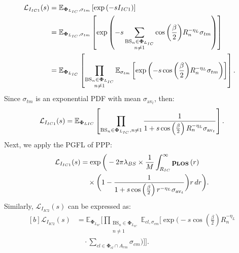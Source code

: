 \documentclass[journal]{IEEEtran}
\begin{document}
\small
\begin{equation}
\begin{aligned}[b]
\!\!\!\!\mathcal{L}_{I_{IC1}} (s)&=\mathbb{E}_{\bold\Phi_{L_{IC}},\sigma_{tm}}\left[\exp\left(-sI_{IC1}\right)\right]\\
\!\!\!\!&=\mathbb{E}_{\bold\Phi_{L_{IC}},\sigma_{tm}}\left[\exp\left(-s \sum\limits_{\substack{\text{BS}_{n }\in \bold\Phi_{L_{IC}}\\ n \neq 1}} \cos{\left(\frac{\beta}{2}\right)} R_n^{-\eta_L} \sigma_{tm} \right)\right]\\
\!\!\!\!&=\mathbb{E}_{\bold\Phi_{L_{IC}}}\left[\prod\limits_{\substack{\text{BS}_{n }\in \bold\Phi_{L_{IC}}\\ n \neq 1}}\mathbb{E}_{\sigma_{tm}}\left[\exp\left(- s  \cos{\left(\frac{\beta}{2}\right)} R_n^{-\eta_L} \sigma_{tm}\right)\right]\right].\\
\end{aligned}
\end{equation}
\normalsize
Since \( \sigma_{tm} \) is an exponential PDF with mean \( \sigma_{\text{av}_t} \), then:
\begin{equation}
\mathcal{L}_{I_{IC1}}(s) = \mathbb{E}_{\bold\Phi_{LIC}} \left[ \prod_{\text{BS}_n \in \bold\Phi_{L_{IC}}, n \neq 1} \frac{1}{1 + s \cos\left( \frac{\beta}{2} \right) R_n^{-\eta_L} \sigma_{\text{av}_t}} \right].
\end{equation}
Next, we apply the PGFL of PPP:
\begin{equation}
\begin{aligned}
\mathcal{L}_{I_{IC1}}(s) &= \exp\bigg( - 2 \pi \lambda_{BS} \times \frac{1}{M} \int_{R_{IC}}^{\infty} \bold p_{\bold{LOS}}\left(r\right)\\
&\quad \times \bigg( 1 - \frac{1}{1 + s \cos\left( \frac{\beta}{2} \right) r^{-\eta_L} \sigma_{\text{av}_t}} \bigg) r \, dr \bigg).
\end{aligned}
\end{equation}
Similarly, $\mathcal{L}_{I_{IC2}} (s)$ can be expressed as:
\small
\begin{equation}
\begin{aligned}[b]\label{int_clu_inmd}
\mathcal{L}_{I_{IC2}} (s) 
&= \mathbb{E}_{\boldsymbol{\Phi}_{L_{IC}}} 
\Bigg[ \prod\limits_{\substack{\text{BS}_{n} \in \boldsymbol{\Phi}_{L_{IC}} \\ n \neq 1}} 
\mathbb{E}_{cl, \sigma_{cm}} 
\Bigg[ \exp\bigg( 
-s \cos{\left(\frac{\beta}{2}\right)} R_n^{-\eta_L} \\
&\quad \cdot 
\sum\limits_{cl \in \boldsymbol{\Phi}_{cl} \cap A_{rm}} 
\sigma_{cm} 
\bigg) \Bigg] \Bigg].
\end{aligned}
\end{equation}
\end{document}
